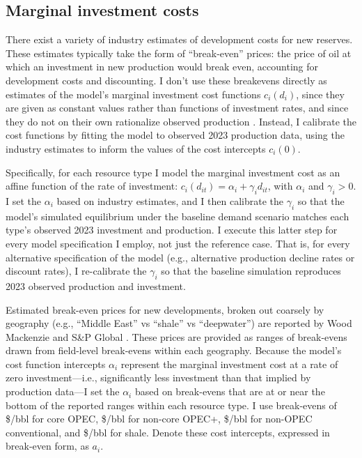 \documentclass[12pt]{article}
\begin{document}
\subsection{Marginal investment costs} \label{sec:cal_cost}

There exist a variety of industry estimates of development costs for new reserves. These estimates typically take the form of ``break-even'' prices: the price of oil at which an investment in new production would break even, accounting for development costs and discounting. I don't use these breakevens directly as estimates of the model's marginal investment cost functions $c_i(d_i)$, since they are given as constant values rather than functions of investment rates, and since they do not on their own rationalize observed production \citep{AskerEtAl2019}. Instead, I calibrate the cost functions by fitting the model to observed 2023 production data, using the industry estimates to inform the values of the cost intercepts $c_i(0)$. 

Specifically, for each resource type I model the marginal investment cost as an affine function of the rate of investment: $c_i(d_{it})=\alpha_i+\gamma_id_{it}$, with $\alpha_i$ and $\gamma_i>0$. I set the $\alpha_i$ based on industry estimates, and I then calibrate the $\gamma_i$ so that the model's simulated equilibrium under the baseline demand scenario matches each type's observed 2023 investment and production. I execute this latter step for every model specification I employ, not just the reference case. That is, for every alternative specification of the model (e.g., alternative production decline rates or discount rates), I re-calibrate the $\gamma_i$ so that the baseline simulation reproduces 2023 observed production and investment.

Estimated break-even prices for new developments, broken out coarsely by geography (e.g., ``Middle East'' vs ``shale'' vs ``deepwater'') are reported by Wood Mackenzie and S\&P Global \citep{woodmac_costs_2019,spglobal_costs_2021}. These prices are provided as ranges of break-evens drawn from field-level break-evens within each geography. Because the model's cost function intercepts $\alpha_i$ represent the marginal investment cost at a rate of zero investment---i.e., significantly less investment than that implied by production data---I set the $\alpha_i$ based on break-evens that are at or near the bottom of the reported ranges within each resource type. I use break-evens of \$\unskip/bbl for core OPEC, \$\unskip/bbl for non-core OPEC+, \$\unskip/bbl for non-OPEC conventional, and \$\unskip/bbl for shale. Denote these cost intercepts, expressed in break-even form, as $a_i$. 
\end{document}
